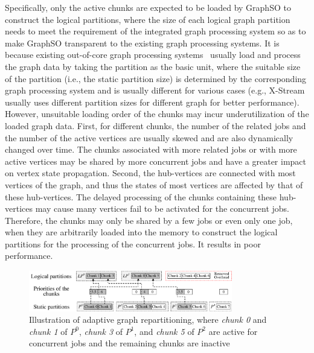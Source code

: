 \documentclass[10pt,journal,compsoc]{IEEEtran}
\begin{document}
Specifically, only the active chunks are expected to be loaded by GraphSO to construct the logical partitions, where the size of each logical graph partition needs to meet the requirement of the integrated graph processing system so as to make GraphSO transparent to the existing graph processing systems. %
It is because existing out-of-core graph processing systems~\cite{GridGraph,GraphChi,X-stream,LUMOS} usually load and process the graph data by taking the partition as the basic unit, where the suitable size of the partition (i.e., the static partition size) is determined by the corresponding graph processing system and is usually different for various cases (e.g., X-Stream~\cite{X-stream} usually uses different partition sizes for different graph for better performance).
However, unsuitable loading order of the chunks may incur underutilization of the loaded graph data. First, for different chunks, the number of the related jobs and the number of the active vertices are usually skewed and are also dynamically changed over time. The chunks associated with more related jobs or with more active vertices may be shared by more concurrent jobs and have a greater impact on vertex state propagation.
Second, the hub-vertices are connected with most vertices of the graph, and thus the states of most vertices are affected by that of these hub-vertices. The delayed processing of the chunks containing these hub-vertices may cause many vertices fail to be activated for the concurrent jobs.
Therefore, the chunks may only be shared by a few jobs or even only one job, when they are arbitrarily loaded into the memory to construct the logical partitions for the processing of the concurrent jobs. It results in poor performance.

\begin{figure}[!t]
	\centering
	\vspace{-0.3cm}
	\includegraphics[width=3.5in]{repartition.pdf}
	\vspace{-22pt}
	\caption{Illustration of adaptive graph repartitioning, where \textit{chunk 0} and \textit{chunk 1} of $P^0$, \textit{chunk 3} of $P^1$, and \textit{chunk 5} of $P^2$ are active for concurrent jobs and the remaining chunks are inactive}
	\label{repartition}
	\vspace{-16pt}
\end{figure}
\end{document}

